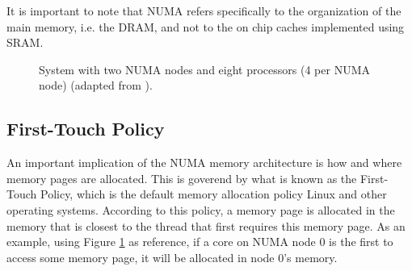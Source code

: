 It is important to note that NUMA refers specifically to the organization of the main memory, i.e. the DRAM, and not to the on chip caches implemented using SRAM.

\begin{figure}[ht]
    \centering
    \caption{System with two NUMA nodes and eight processors (4 per NUMA node) (adapted from \cite{10.1145/2508834.2513149}).}
    \label{fig:numanode}
\end{figure}

\subsection{First-Touch Policy}
\label{sec:firstouch}
An important implication of the NUMA memory architecture is how and where memory pages are allocated. This is goverend by what is known as the First-Touch Policy, which is the default memory allocation policy Linux and other operating systems. According to this policy, a memory page is allocated in the memory that is closest to the thread that first requires this memory page. As an example, using Figure \ref{fig:numanode} as reference, if a core on NUMA node 0 is the first to access some memory page, it will be allocated in node 0's memory.


 


